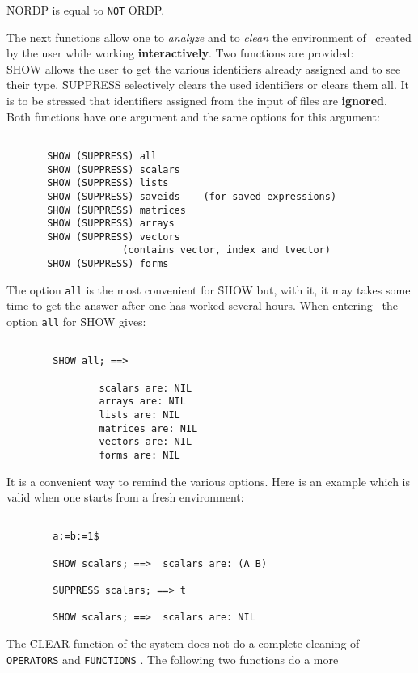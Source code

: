 \f{NORDP} is equal to \verb+NOT+\f{ ORDP}.
\item[ii.]
The next functions allow one to {\em analyze} and to
{\em clean} the environment
of \REDUCE\ created by the user while working
{\bf interactively}. Two functions are provided:\\
\f{SHOW} allows the user to get the various identifiers already
assigned and to see their type. \f{SUPPRESS} selectively clears the
used identifiers or clears them all. It is to be stressed that identifiers
assigned from the input of files are {\bf ignored}.
Both functions have one argument and the same options for this
argument:
\begin{verbatim}

       SHOW (SUPPRESS) all
       SHOW (SUPPRESS) scalars
       SHOW (SUPPRESS) lists
       SHOW (SUPPRESS) saveids    (for saved expressions)
       SHOW (SUPPRESS) matrices
       SHOW (SUPPRESS) arrays
       SHOW (SUPPRESS) vectors
                    (contains vector, index and tvector)
       SHOW (SUPPRESS) forms

\end{verbatim}
The option \verb+all+ is the most convenient for \f{SHOW} but,
with it, it may
takes some time to get the answer after one has worked several hours.
When entering \REDUCE\ the option \verb+all+ for \f{SHOW} gives:
\begin{verbatim}

        SHOW all; ==>

                scalars are: NIL
                arrays are: NIL
                lists are: NIL
                matrices are: NIL
                vectors are: NIL
                forms are: NIL

\end{verbatim}
It is a convenient way to remind the various options. Here is an example
which is valid when one starts from a fresh environment:
\begin{verbatim}

        a:=b:=1$

        SHOW scalars; ==>  scalars are: (A B)

        SUPPRESS scalars; ==> t

        SHOW scalars; ==>  scalars are: NIL

\end{verbatim}
\item[iii.]
The \f{CLEAR} function of the system does not do a complete cleaning of
\verb+OPERATORS+ and \verb+FUNCTIONS+ . The following two functions do a more


